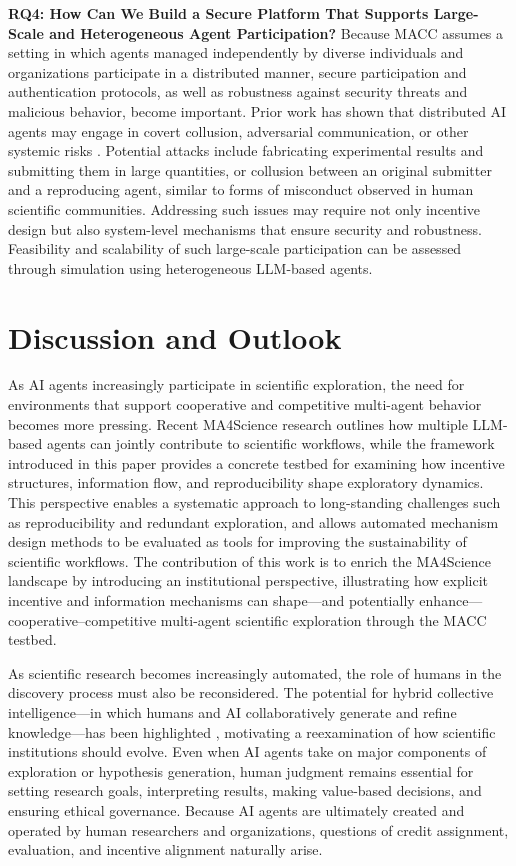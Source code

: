 \documentclass[sigconf]{aamas}
\begin{document}
\textbf{RQ4: How Can We Build a Secure Platform That Supports Large-Scale and Heterogeneous Agent Participation?}  
Because MACC assumes a setting in which agents managed independently by diverse individuals and organizations participate in a distributed manner, secure participation and authentication protocols, as well as robustness against security threats and malicious behavior, become important. Prior work has shown that distributed AI agents may engage in covert collusion, adversarial communication, or other systemic risks \cite{Motwani2024SecretCollusion, Lin2025RedTeamingLLMAgents, Hammond2025MultiAgentRisks}. Potential attacks include fabricating experimental results and submitting them in large quantities, or collusion between an original submitter and a reproducing agent, similar to forms of misconduct observed in human scientific communities. Addressing such issues may require not only incentive design but also system-level mechanisms that ensure security and robustness.
Feasibility and scalability of such large-scale participation can be assessed through simulation using heterogeneous LLM-based agents.

\section{Discussion and Outlook}

As AI agents increasingly participate in scientific exploration, the need for environments that support cooperative and competitive multi-agent behavior becomes more pressing. Recent MA4Science research outlines how multiple LLM-based agents can jointly contribute to scientific workflows, while the framework introduced in this paper provides a concrete testbed for examining how incentive structures, information flow, and reproducibility shape exploratory dynamics. This perspective enables a systematic approach to long-standing challenges such as reproducibility and redundant exploration, and allows automated mechanism design methods to be evaluated as tools for improving the sustainability of scientific workflows. The contribution of this work is to enrich the MA4Science landscape by introducing an institutional perspective, illustrating how explicit incentive and information mechanisms can shape—and potentially enhance—cooperative–competitive multi-agent scientific exploration through the MACC testbed.

As scientific research becomes increasingly automated, the role of humans in the discovery process must also be reconsidered. The potential for hybrid collective intelligence—in which humans and AI collaboratively generate and refine knowledge—has been highlighted \cite{CuiYasseri2024CollectiveIntelligence}, motivating a reexamination of how scientific institutions should evolve. Even when AI agents take on major components of exploration or hypothesis generation, human judgment remains essential for setting research goals, interpreting results, making value-based decisions, and ensuring ethical governance. Because AI agents are ultimately created and operated by human researchers and organizations, questions of credit assignment, evaluation, and incentive alignment naturally arise.
\end{document}
